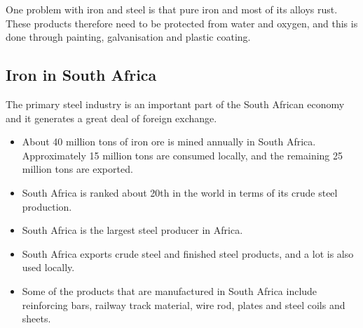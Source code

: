 One problem with iron and steel is that pure iron and most of its alloys rust. These products therefore need to be protected from water and oxygen, and this is done through painting, galvanisation and plastic coating.



\subsection{Iron in South Africa}

The primary steel industry is an important part of the South African economy and it generates a great deal of foreign exchange.

\begin{itemize}
\item{About 40 million tons of iron ore is mined annually in South Africa. Approximately 15 million tons are consumed locally, and the remaining 25 million tons are exported.}
\item{South Africa is ranked about 20th in the world in terms of its crude steel production.}
\item{South Africa is the largest steel producer in Africa.}
\item{South Africa exports crude steel and finished steel products, and a lot is also used locally.}
\item{Some of the products that are manufactured in South Africa include reinforcing bars, railway track material, wire rod, plates and steel coils and sheets.}
\end{itemize}

